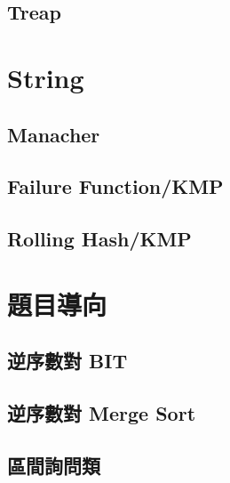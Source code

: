 	\subsection{Treap}
		
\section{String}
	\subsection{Manacher}
		
	\subsection{Failure Function/KMP}
		
	\subsection{Rolling Hash/KMP}
		
\section{題目導向}
	\subsection{逆序數對 BIT}
		
	\subsection{逆序數對 Merge Sort}
		
	\subsection{區間詢問類}
		
